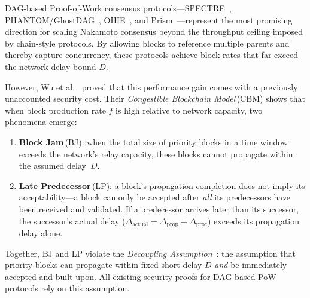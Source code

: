 \documentclass[11pt]{article}
\theoremstyle{definition}
\theoremstyle{plain}
\theoremstyle{remark}
\begin{document}
DAG-based Proof-of-Work consensus protocols---SPECTRE~\cite{sompolinsky2016spectre},
PHANTOM/GhostDAG~\cite{sompolinsky2018phantom,sompolinsky2021ghostdag},
OHIE~\cite{yu2021ohie}, and Prism~\cite{bagaria2019prism}---represent the most
promising direction for scaling Nakamoto consensus beyond the throughput ceiling
imposed by chain-style protocols.
By allowing blocks to reference multiple parents and thereby capture concurrency,
these protocols achieve block rates that far exceed the network delay bound $D$.

However, Wu et al.~\cite{wu2024security} proved that this performance gain comes
with a previously unaccounted security cost.
Their \emph{Congestible Blockchain Model}\,(CBM) shows that when block production
rate $f$ is high relative to network capacity, two phenomena emerge:
\begin{enumerate}[nosep]
    \item \textbf{Block Jam}\,(BJ): when the total size of priority blocks in a
    time window exceeds the network's relay capacity, these blocks cannot
    propagate within the assumed delay~$D$.
    \item \textbf{Late Predecessor}\,(LP): a block's propagation completion does
    not imply its acceptability---a block can only be accepted after \emph{all}
    its predecessors have been received and validated.
    If a predecessor arrives later than its successor, the successor's actual
    delay ($\Delta_{\mathrm{actual}} = \Delta_{\mathrm{prop}} +
    \Delta_{\mathrm{proc}}$) exceeds its propagation delay alone.
\end{enumerate}

Together, BJ and LP violate the \emph{Decoupling
Assumption}~\cite{wu2024security}: the assumption that priority blocks can
propagate within fixed short delay $D$ \emph{and} be immediately accepted and
built upon.  All existing security proofs for DAG-based PoW protocols rely on
this assumption.
\end{document}

